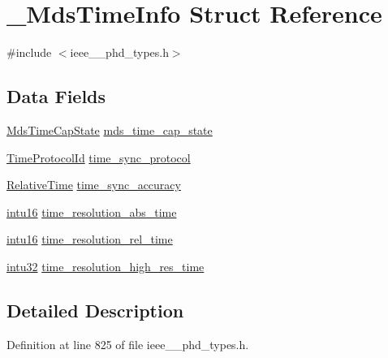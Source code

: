 \hypertarget{struct___mds_time_info}{}\section{\+\_\+\+Mds\+Time\+Info Struct Reference}
\label{struct___mds_time_info}


{\ttfamily \#include $<$ieee\+\_\+\_\+phd\+\_\+types.\+h$>$}

\subsection*{Data Fields}
\begin{DoxyCompactItemize}
\item 
\hyperlink{ieee__11073__phd__types_8h_a2f4d6a9ca9b9284c74a21d71359d1336}{Mds\+Time\+Cap\+State} \hyperlink{struct___mds_time_info_afb12c3a66fc32cca1bbea0fabd529e6e}{mds\+\_\+time\+\_\+cap\+\_\+state}
\item 
\hyperlink{ieee__11073__phd__types_8h_ae7d96d7593145e287fb3867bb749b790}{Time\+Protocol\+Id} \hyperlink{struct___mds_time_info_ab5af682973f964b188cbc3d862896700}{time\+\_\+sync\+\_\+protocol}
\item 
\hyperlink{ieee__11073__phd__types_8h_a396922eed4599fd81cd463e5c941eb03}{Relative\+Time} \hyperlink{struct___mds_time_info_ab72ebe91e37480fc6b3b053c7eee81fb}{time\+\_\+sync\+\_\+accuracy}
\item 
\hyperlink{ieee__11073__phd__types_8h_a3561595d2aa7416532e1c9910abd076d}{intu16} \hyperlink{struct___mds_time_info_a2be547f41eeab72e27efe9f4aceff94f}{time\+\_\+resolution\+\_\+abs\+\_\+time}
\item 
\hyperlink{ieee__11073__phd__types_8h_a3561595d2aa7416532e1c9910abd076d}{intu16} \hyperlink{struct___mds_time_info_a3d0c4dbf0c9a992635f0f6063fb13432}{time\+\_\+resolution\+\_\+rel\+\_\+time}
\item 
\hyperlink{ieee__11073__phd__types_8h_a22fd02d9fb90b079261a56b300e7f3c1}{intu32} \hyperlink{struct___mds_time_info_a982604dcbea03110fed09a72ab65db02}{time\+\_\+resolution\+\_\+high\+\_\+res\+\_\+time}
\end{DoxyCompactItemize}


\subsection{Detailed Description}


Definition at line 825 of file ieee\+\_\+\_\+phd\+\_\+types.\+h.



